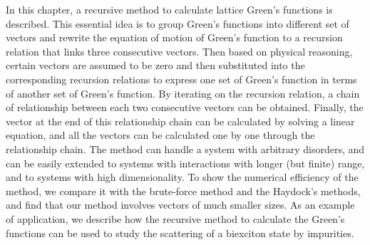 In this chapter, a recursive method to calculate lattice Green's functions is described. This essential idea 
is to group Green's functions into different set of vectors and rewrite the equation of motion of Green's function to a 
recursion relation that links three consecutive vectors. Then based on physical reasoning, certain vectors are 
assumed to be zero and then substituted into the corresponding recursion relations to express one set
of Green's function in terms of another set of Green's function. By iterating on the recursion relation, a 
chain of relationship between each two consecutive vectors can be obtained. Finally, the vector at the end of this 
relationship chain can be calculated by solving a linear equation, and all the vectors can be calculated one by one
through the relationship chain.   
The method can handle a system with arbitrary 
disorders, and can be easily extended to systems with interactions with longer (but finite) range, and to systems with
high dimensionality. To show the numerical efficiency of the method, we compare it with the brute-force method and
the Haydock's methods, and find that our method involves vectors of much smaller sizes. As an example of
application, we describe how the recursive method to calculate the Green's functions can be used to study the 
scattering of a biexciton state by impurities. 
 
